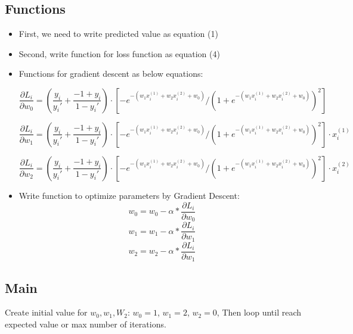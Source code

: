 \documentclass{article}
\begin{document}
\subsection{Functions}
\begin{itemize}
    \item First, we need to write predicted value as equation (1)
    \item Second, write function for loss function as equation (4)
    \item Functions for gradient descent as below equations: 

\begin{equation}
\frac{\partial L_i}{\partial w_0} =
\left( \frac{y_i}{y_i'} + \frac{-1 + y_i}{1 - y_i'} \right) \cdot \left[ -e^{- (w_1 x_i^{(1)} + w_2 x_i^{(2)} + w_0 )} / \left( 1 + e^{-(w_1 x_{i}^{(1)} + w_2 x_{i}^{(2)} + w_0 )}\right)^2 \right]
\end{equation}

\begin{equation}
\frac{\partial L_i}{\partial w_1} =
\left( \frac{y_i}{y_i'} + \frac{-1 + y_i}{1 - y_i'} \right) \cdot \left[ -e^{- (w_1 x_i^{(1)} + w_2 x_i^{(2)} + w_0 )} / \left( 1 + e^{-(w_1 x_{i}^{(1)} + w_2 x_{i}^{(2)} + w_0 )}\right)^2 \right] \cdot x_i^{(1)}
\end{equation}

\begin{equation}
\frac{\partial L_i}{\partial w_2} =
\left( \frac{y_i}{y_i'} + \frac{-1 + y_i}{1 - y_i'} \right) \cdot \left[ -e^{- (w_1 x_i^{(1)} + w_2 x_i^{(2)} + w_0 )} / \left( 1 + e^{-(w_1 x_{i}^{(1)} + w_2 x_{i}^{(2)} + w_0 )}\right)^2 \right] \cdot x_i^{(2)}
\end{equation}

    \item Write function to optimize parameters by Gradient Descent:
\begin{equation}
w_0 = w_0 - \alpha* \frac{\partial L_i}{\partial w_0}
\end{equation}
\begin{equation}
w_1 = w_1 - \alpha* \frac{\partial L_i}{\partial w_1}
\end{equation}
\begin{equation}
w_2 = w_2 - \alpha* \frac{\partial L_i}{\partial w_1}
\end{equation}
\end{itemize}

\subsection{Main}
Create initial value for \(w_0, w_1, W_2\):
\(w_0 = 1\),
\(w_1 = 2\),
\(w_2 = 0\),
Then loop until reach expected value or max number of iterations.
\end{document}

